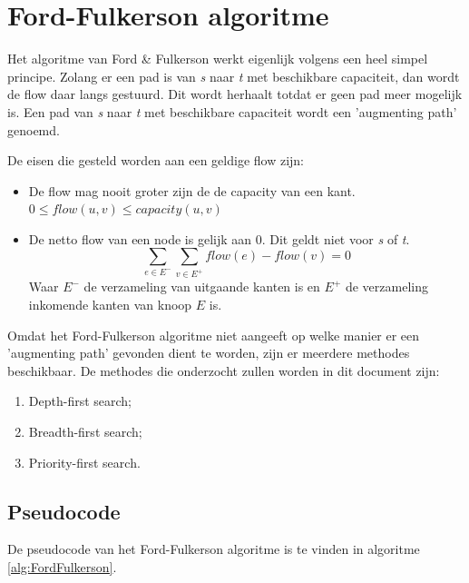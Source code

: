\section{Ford-Fulkerson algoritme}
\label{sec:fordfulkerson}

Het algoritme van Ford \& Fulkerson werkt eigenlijk volgens een heel simpel principe. Zolang er een pad is van \textit{s} naar \textit{t} met beschikbare capaciteit, dan wordt de flow daar langs gestuurd. Dit wordt herhaalt totdat er geen pad meer mogelijk is. Een pad van \textit{s} naar \textit{t} met beschikbare capaciteit wordt een 'augmenting path' genoemd.

De eisen die gesteld worden aan een geldige flow zijn:

\begin{itemize}
	\item De flow mag nooit groter zijn de de capacity van een kant. $0 \leq flow(u,v) \leq capacity(u,v)$
	\item De netto flow van een node is gelijk aan 0. Dit geldt niet voor \textit{s} of \textit{t}.$$\sum_{e \in E^-}\sum_{v \in E^+}{flow(e)-flow(v)} = 0$$
Waar $E^-$ de verzameling van uitgaande kanten is en $E^+$ de verzameling inkomende kanten van knoop $E$ is.
\end{itemize}

Omdat het Ford-Fulkerson algoritme niet aangeeft op welke manier er een 'augmenting path' gevonden dient te worden, zijn er meerdere methodes beschikbaar.
De methodes die onderzocht zullen worden in dit document zijn:

\begin{enumerate}
	\item Depth-first search;
	\item Breadth-first search;
	\item Priority-first search.
\end{enumerate}

\subsection{Pseudocode}

De pseudocode van het Ford-Fulkerson algoritme is te vinden in algoritme \ref{alg:FordFulkerson}.

